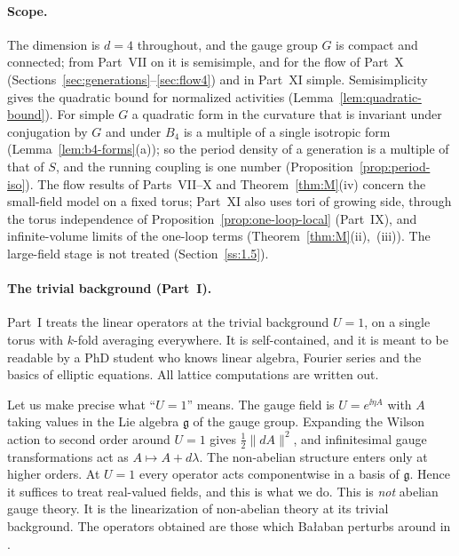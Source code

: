 \paragraph{Scope.} The dimension is $d=4$ throughout, and the gauge group $G$ is compact and connected; from Part~VII on it is semisimple, and for the flow of Part~X (Sections~\ref{sec:generations}--\ref{sec:flow4}) and in Part~XI simple. Semisimplicity gives the quadratic bound for normalized activities (Lemma~\ref{lem:quadratic-bound}). For simple $G$ a quadratic form in the curvature that is invariant under conjugation by $G$ and under $B_4$ is a multiple of a single isotropic form (Lemma~\ref{lem:b4-forms}(a)); so the period density of a generation is a multiple of that of $S$, and the running coupling is one number (Proposition~\ref{prop:period-iso}). The flow results of Parts~VII--X and Theorem~\ref{thm:M}(iv) concern the small-field model on a fixed torus; Part~XI also uses tori of growing side, through the torus independence of Proposition~\ref{prop:one-loop-local} (Part~IX), and infinite-volume limits of the one-loop terms (Theorem~\ref{thm:M}(ii),~(iii)). The large-field stage is not treated (Section~\ref{ss:1.5}).

\paragraph{The trivial background (Part~I).} Part~I treats the linear operators at the trivial background $U=1$, on a single torus with $k$-fold averaging everywhere. It is self-contained, and it is meant to be readable by a PhD student who knows linear algebra, Fourier series and the basics of elliptic equations. All lattice computations are written out.

Let us make precise what ``$U=1$'' means. The gauge field is $U=e^{\ii\eta A}$ with $A$ taking values in the Lie algebra $\mathfrak g$ of the gauge group. Expanding the Wilson action to second order around $U=1$ gives $\tfrac12\|dA\|^2$, and infinitesimal gauge transformations act as $A\mapsto A+d\lambda$. The non-abelian structure enters only at higher orders. At $U=1$ every operator acts componentwise in a basis of $\mathfrak g$. Hence it suffices to treat real-valued fields, and this is what we do. This is \emph{not} abelian gauge theory. It is the linearization of non-abelian theory at its trivial background. The operators obtained are those which Ba\l aban perturbs around in \cite{BalBackground,BalVar}.


